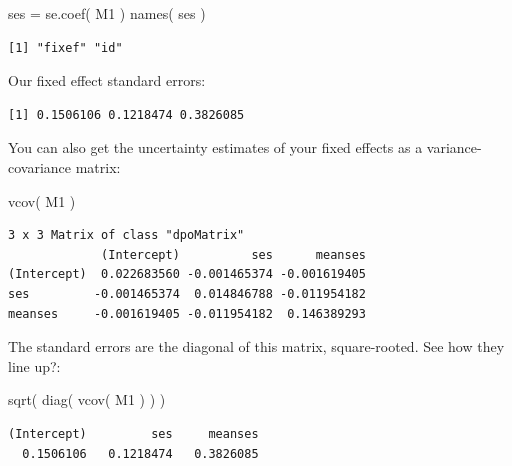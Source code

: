 \documentclass[
  letterpaper,
  DIV=11,
  numbers=noendperiod]{scrreprt}
\newenvironment{Shaded}{\begin{snugshade}}{\end{snugshade}}
\newcommand{\FunctionTok}[1]{\textcolor[rgb]{0.02,0.16,0.49}{#1}}
\newcommand{\NormalTok}[1]{\textcolor[rgb]{0.00,0.44,0.13}{#1}}
\newcommand{\OtherTok}[1]{\textcolor[rgb]{0.00,0.44,0.13}{#1}}
\newcommand{\SpecialCharTok}[1]{\textcolor[rgb]{0.25,0.44,0.63}{#1}}
\begin{document}
\begin{Shaded}
\begin{Highlighting}[]
\NormalTok{ses }\OtherTok{=} \FunctionTok{se.coef}\NormalTok{( M1 )}
\FunctionTok{names}\NormalTok{( ses )}
\end{Highlighting}
\end{Shaded}

\begin{verbatim}
[1] "fixef" "id"   
\end{verbatim}

Our fixed effect standard errors:

\begin{Shaded}
\end{Shaded}

\begin{verbatim}
[1] 0.1506106 0.1218474 0.3826085
\end{verbatim}

You can also get the uncertainty estimates of your fixed effects as a
variance-covariance matrix:

\begin{Shaded}
\begin{Highlighting}[]
\FunctionTok{vcov}\NormalTok{( M1 )}
\end{Highlighting}
\end{Shaded}

\begin{verbatim}
3 x 3 Matrix of class "dpoMatrix"
             (Intercept)          ses      meanses
(Intercept)  0.022683560 -0.001465374 -0.001619405
ses         -0.001465374  0.014846788 -0.011954182
meanses     -0.001619405 -0.011954182  0.146389293
\end{verbatim}

The standard errors are the diagonal of this matrix, square-rooted. See
how they line up?:

\begin{Shaded}
\begin{Highlighting}[]
\FunctionTok{sqrt}\NormalTok{( }\FunctionTok{diag}\NormalTok{( }\FunctionTok{vcov}\NormalTok{( M1 ) ) )}
\end{Highlighting}
\end{Shaded}

\begin{verbatim}
(Intercept)         ses     meanses 
  0.1506106   0.1218474   0.3826085 
\end{verbatim}
\end{document}
